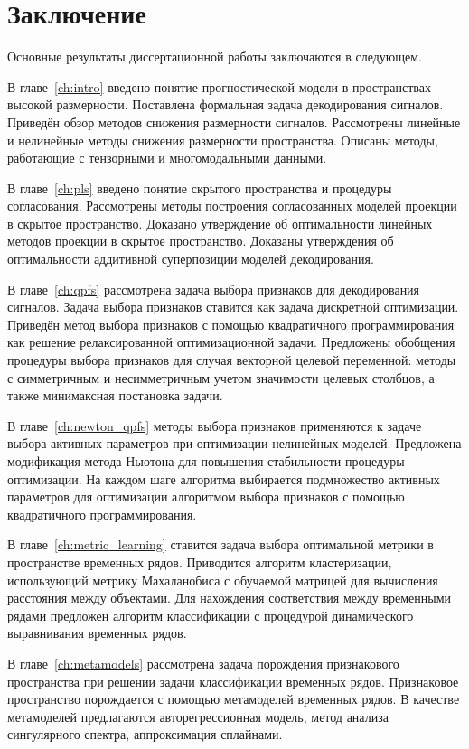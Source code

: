 \chapter*{Заключение}

Основные результаты диссертационной работы заключаются в следующем.

В главе~\ref{ch:intro} введено понятие прогностической модели в пространствах высокой размерности.
Поставлена формальная задача декодирования сигналов.
Приведён обзор методов снижения размерности сигналов.
Рассмотрены линейные и нелинейные методы снижения размерности пространства.
Описаны методы, работающие с тензорными и многомодальными данными.

В главе~\ref{ch:pls} введено понятие скрытого пространства и процедуры согласования.
Рассмотрены методы построения согласованных моделей проекции в скрытое пространство.
Доказано утверждение об оптимальности линейных методов проекции в скрытое пространство.
Доказаны утверждения об оптимальности аддитивной суперпозиции моделей декодирования.

В главе~\ref{ch:qpfs} рассмотрена задача выбора признаков для декодирования сигналов.
Задача выбора признаков ставится как задача дискретной оптимизации. 
Приведён метод выбора признаков с помощью квадратичного программирования как решение релаксированной оптимизационной задачи.
Предложены обобщения процедуры выбора признаков для случая векторной целевой переменной: методы с симметричным и несимметричным учетом значимости целевых столбцов, а также минимаксная постановка задачи.

В главе~\ref{ch:newton_qpfs} методы выбора признаков применяются к задаче выбора активных параметров при оптимизации нелинейных моделей.
Предложена модификация метода Ньютона для повышения стабильности процедуры оптимизации.
На каждом шаге алгоритма выбирается подмножество активных параметров для оптимизации алгоритмом выбора признаков с помощью квадратичного программирования.

В главе~\ref{ch:metric_learning} ставится задача выбора оптимальной метрики в пространстве временных рядов.
Приводится алгоритм кластеризации, использующий метрику Махаланобиса с обучаемой матрицей для вычисления расстояния между объектами. 
Для нахождения соответствия между временными рядами предложен алгоритм классификации с процедурой динамического выравнивания временных рядов.

В главе~\ref{ch:metamodels} рассмотрена задача порождения признакового пространства при решении задачи классификации временных рядов.
Признаковое пространство порождается с помощью метамоделей временных рядов.
В качестве метамоделей предлагаются авторегрессионная модель, метод анализа сингулярного спектра, аппроксимация сплайнами.